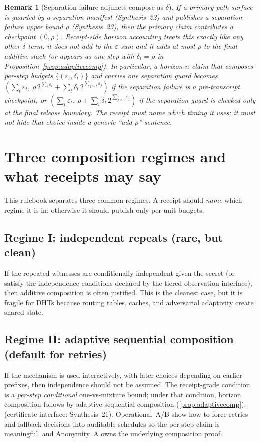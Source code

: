 \documentclass[11pt]{article}
\newtheorem{remark}{Remark}
\begin{document}
\begin{remark}[Separation-failure adjuncts compose as $\delta$]
If a primary-path surface is guarded by a separation manifest (Synthesis~22) and publishes a separation-failure upper bound $\rho$ (Synthesis~23), then the primary claim contributes a checkpoint $(0,\rho)$.
Receipt-side horizon accounting treats this exactly like any other $\delta$ term: it does not add to the $\varepsilon$ sum and it adds at most $\rho$ to the final additive slack (or appears as one step with $\delta_t=\rho$ in Proposition~\ref{prop:adaptivecomp}).\cite{series:primarysepmanifest,series:probsep}
In particular, a horizon-$n$ claim that composes per-step budgets $\{(\varepsilon_t,\delta_t)\}$ and carries one separation guard becomes
$(\sum_t\varepsilon_t,\ \rho\,2^{\sum_t\varepsilon_t} + \sum_t \delta_t\,2^{\sum_{j>t}\varepsilon_j})$ if the separation failure is a pre-transcript checkpoint, or
$(\sum_t\varepsilon_t,\ \rho + \sum_t \delta_t\,2^{\sum_{j>t}\varepsilon_j})$ if the separation guard is checked only at the final release boundary.
The receipt must name which timing it uses; it must not hide that choice inside a generic ``add $\rho$'' sentence.
\end{remark}

\section{Three composition regimes and what receipts may say}
This rulebook separates three common regimes.
A receipt should \emph{name} which regime it is in; otherwise it should publish only per-unit budgets.

\subsection{Regime I: independent repeats (rare, but clean)}
If the repeated witnesses are conditionally independent given the secret (or satisfy the independence conditions declared by the tiered-observation interface), then additive composition is often justified.\cite{series:contractobjects,series:tieredobs}
This is the cleanest case, but it is fragile for DHTs because routing tables, caches, and adversarial adaptivity create shared state.

\subsection{Regime II: adaptive sequential composition (default for retries)}
If the mechanism is used interactively, with later choices depending on earlier prefixes, then independence should not be assumed.
The receipt-grade condition is a \emph{per-step conditional} one-vs-mixture bound; under that condition, horizon composition follows by adaptive sequential composition (\cref{prop:adaptivecomp}). (certificate interface: Synthesis~21).\cite{series:condcert}
Operational~A/B show how to force retries and fallback decisions into auditable schedules so the per-step claim is meaningful, and Anonymity~A owns the underlying composition proof.\cite{series:operationalA,series:operationalB,series:oddsinflation}
\end{document}
